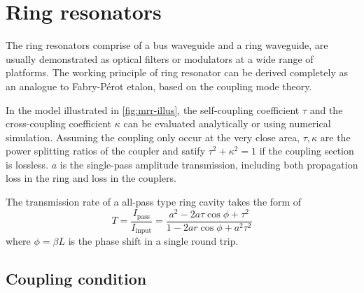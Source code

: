 \section{Ring resonators}

The ring resonators comprise of a bus waveguide and a ring waveguide, are usually demonstrated as optical filters or modulators at a wide range of platforms. The working principle of ring resonator can be derived completely \cite{Bogaerts2012} as an analogue to Fabry-P\'{e}rot etalon, based on the coupling mode theory. 

\begin{figure}
    \centering
	
    \label{fig:mrr-illus}
\end{figure}

In the model illustrated in \autoref{fig:mrr-illus}, the self-coupling coefficient $\tau$ and the cross-coupling coefficient $\kappa$ can be evaluated analytically or using numerical simulation. Assuming the coupling only occur at the very close area, $\tau,\kappa$ are the power splitting ratios of the coupler and satify $\tau^2 + \kappa^2 =1 $ if the coupling section is lossless. $a$ is the single-pass amplitude transmission, including both propagation loss in the ring and loss in the couplers.

\begin{figure}
    \centering
    
    \label{fig:mrr_spec}
\end{figure}

The transmission rate of a all-pass type ring cavity takes the form of
\begin{equation}\label{eq:trans_phi}
    T = \frac{I_\mathrm{pass}}{I_\mathrm{input}} = \frac{a^2 - 2a\tau \cos \phi + \tau^2}{1 - 2ar \cos \phi + a^2 \tau^2}
\end{equation}
where $\phi=\beta L$ is the phase shift in a single round trip. 

\subsection{Coupling condition}

